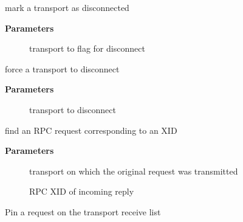 \documentclass[a4paper,8pt,english]{sphinxmanual}
\begin{document}
\begin{fulllineitems}
\label{networking/kapi:c.xprt_disconnect_done}
mark a transport as disconnected

\end{fulllineitems}


\textbf{Parameters}
\begin{description}
\item[{}] \leavevmode
transport to flag for disconnect

\end{description}

\begin{fulllineitems}
\label{networking/kapi:c.xprt_force_disconnect}
force a transport to disconnect

\end{fulllineitems}


\textbf{Parameters}
\begin{description}
\item[{}] \leavevmode
transport to disconnect

\end{description}

\begin{fulllineitems}
\label{networking/kapi:c.xprt_lookup_rqst}
find an RPC request corresponding to an XID

\end{fulllineitems}


\textbf{Parameters}
\begin{description}
\item[{}] \leavevmode
transport on which the original request was transmitted

\item[{}] \leavevmode
RPC XID of incoming reply

\end{description}

\begin{fulllineitems}
\label{networking/kapi:c.xprt_pin_rqst}
Pin a request on the transport receive list

\end{fulllineitems}
\end{document}
